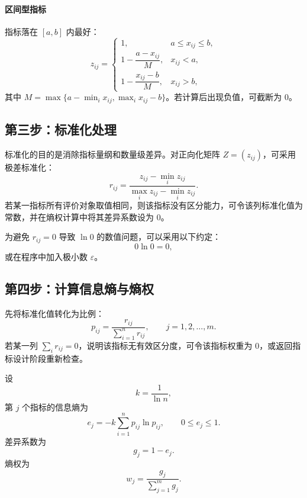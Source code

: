 \documentclass[UTF8,zihao=-4]{ctexart}
\begin{document}
\paragraph{区间型指标}指标落在 $[a,b]$ 内最好：
\begin{equation}
z_{ij}=\begin{cases}
1, & a\le x_{ij}\le b,\\
1-\dfrac{a-x_{ij}}{M}, & x_{ij}<a,\\
1-\dfrac{x_{ij}-b}{M}, & x_{ij}>b,
\end{cases}
\end{equation}
其中 $M=\max\{a-\min_i x_{ij},\max_i x_{ij}-b\}$。若计算后出现负值，可截断为 0。

\subsection{第三步：标准化处理}
标准化的目的是消除指标量纲和数量级差异。对正向化矩阵 $Z=(z_{ij})$，可采用极差标准化：
\begin{equation}
r_{ij}=\frac{z_{ij}-\min_i z_{ij}}{\max_i z_{ij}-\min_i z_{ij}}.
\end{equation}
若某一指标所有评价对象取值相同，则该指标没有区分能力，可令该列标准化值为常数，并在熵权计算中将其差异系数设为 0。

为避免 $r_{ij}=0$ 导致 $\ln 0$ 的数值问题，可以采用以下约定：
\begin{equation}
0\ln 0=0,
\end{equation}
或在程序中加入极小数 $\varepsilon$。

\subsection{第四步：计算信息熵与熵权}
先将标准化值转化为比例：
\begin{equation}
p_{ij}=\frac{r_{ij}}{\sum_{i=1}^{n}r_{ij}},\qquad j=1,2,\dots,m.
\end{equation}
若某一列 $\sum_i r_{ij}=0$，说明该指标无有效区分度，可令该指标权重为 0，或返回指标设计阶段重新检查。

设
\begin{equation}
k=\frac{1}{\ln n},
\end{equation}
第 $j$ 个指标的信息熵为
\begin{equation}
e_j=-k\sum_{i=1}^{n}p_{ij}\ln p_{ij},\qquad 0\le e_j\le 1.
\end{equation}
差异系数为
\begin{equation}
g_j=1-e_j.
\end{equation}
熵权为
\begin{equation}
w_j=\frac{g_j}{\sum_{j=1}^{m}g_j}.
\end{equation}
\end{document}

